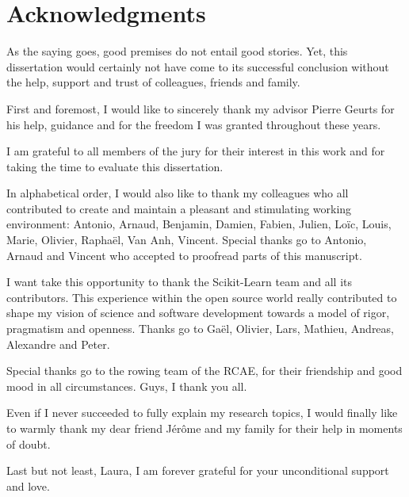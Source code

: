 
\chapter*{Acknowledgments}

As the saying goes, good premises do not entail good stories. Yet, this
dissertation would certainly not have come to its successful conclusion
without the help, support and trust of colleagues, friends and family.

First and foremost, I would like to sincerely thank my advisor Pierre Geurts
for his help, guidance and for the freedom I was granted throughout these
years.

I am grateful to all members of the jury for their interest in this work
and for taking the  time to evaluate this dissertation.

In alphabetical order, I would also like to thank my colleagues who all
contributed to create and maintain a pleasant and stimulating working
environment: Antonio, Arnaud, Benjamin, Damien, Fabien, Julien, Lo\"{i}c,
Louis, Marie, Olivier, Rapha\"{e}l, Van Anh, Vincent. Special thanks go to
Antonio, Arnaud and Vincent who accepted to proofread parts of this manuscript.

I want take this opportunity to thank the Scikit-Learn team and all its
contributors. This experience within the open source world really contributed
to shape my vision of science and software development towards a model
of rigor, pragmatism and openness. Thanks go to Ga\"{e}l, Olivier, Lars,
Mathieu, Andreas, Alexandre and Peter.

Special thanks go to the rowing team of the RCAE, for their friendship
and good mood in all circumstances. Guys, I thank you all.

Even if I never succeeded to fully explain my research topics, I would finally
like to warmly thank my dear friend J\'er\^{o}me and my family for their help
in moments of doubt.

Last but not least, Laura, I am forever grateful for your unconditional support
and love.
